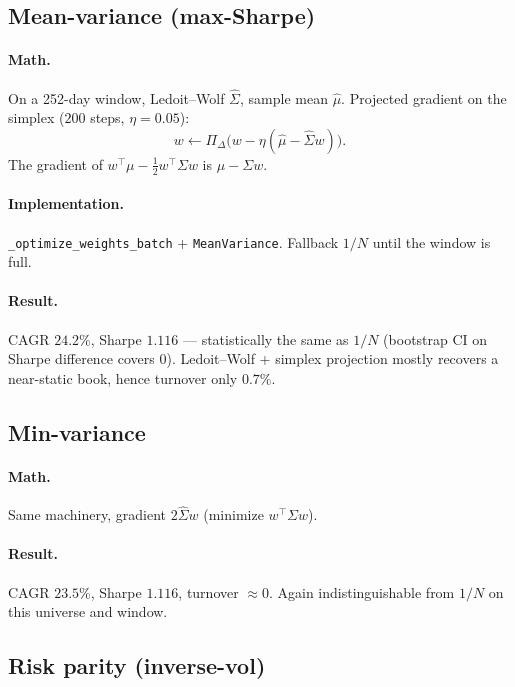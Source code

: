 \documentclass[11pt]{article}
\begin{document}
\subsection{Mean-variance (max-Sharpe)}

\paragraph{Math.}
On a 252-day window, Ledoit--Wolf $\hat\Sigma$, sample mean $\hat\mu$.
Projected gradient on the simplex ($200$ steps, $\eta=0.05$):
\begin{equation}
w\leftarrow \Pi_{\Delta}\bigl(w-\eta(\hat\mu-\hat\Sigma w)\bigr).
\end{equation}
The gradient of $w^\top\mu-\tfrac12 w^\top\Sigma w$ is $\mu-\Sigma w$.

\paragraph{Implementation.}
\texttt{\_optimize\_weights\_batch} + \texttt{MeanVariance}.
Fallback $1/N$ until the window is full.

\paragraph{Result.}
CAGR $24.2\%$, Sharpe $1.116$ --- statistically the same as $1/N$
(bootstrap CI on Sharpe difference covers 0).
Ledoit--Wolf + simplex projection mostly recovers a near-static book,
hence turnover only $0.7\%$.

\subsection{Min-variance}

\paragraph{Math.}
Same machinery, gradient $2\hat\Sigma w$ (minimize $w^\top\Sigma w$).

\paragraph{Result.}
CAGR $23.5\%$, Sharpe $1.116$, turnover $\approx 0$.
Again indistinguishable from $1/N$ on this universe and window.

\subsection{Risk parity (inverse-vol)}
\end{document}
